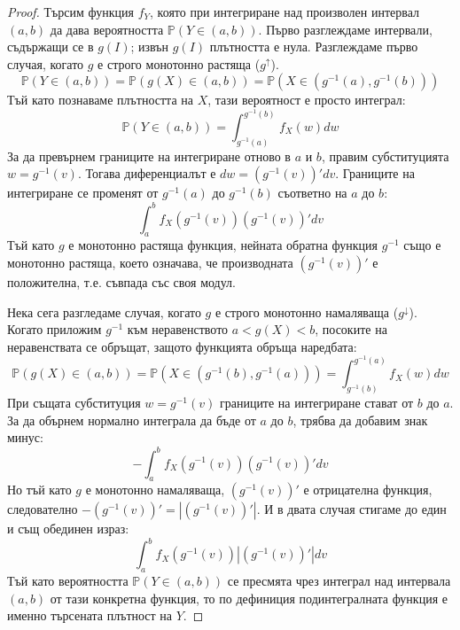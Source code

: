 \begin{proof}
Търсим функция $f_Y$, която при интегриране над произволен интервал $(a, b)$ да дава вероятността $\mathbb{P}(Y \in (a, b))$. Първо разглеждаме интервали, съдържащи се в $g(I)$; извън $g(I)$ плътността е нула.
Разглеждаме първо случая, когато $g$ е строго монотонно растяща ($g^{\uparrow}$).
\[
\mathbb{P}(Y \in (a, b)) = \mathbb{P}(g(X) \in (a, b)) = \mathbb{P}(X \in (g^{-1}(a), g^{-1}(b)))
\]
Тъй като познаваме плътността на $X$, тази вероятност е просто интеграл:
\[
\mathbb{P}(Y \in (a, b)) = \int_{g^{-1}(a)}^{g^{-1}(b)} f_X(w) dw
\]
За да превърнем границите на интегриране отново в $a$ и $b$, правим субституцията $w = g^{-1}(v)$. Тогава диференциалът е $dw = (g^{-1}(v))' dv$. Границите на интегриране се променят от $g^{-1}(a)$ до $g^{-1}(b)$ съответно на $a$ до $b$:
\[
\int_{a}^{b} f_X(g^{-1}(v)) (g^{-1}(v))' dv
\]
Тъй като $g$ е монотонно растяща функция, нейната обратна функция $g^{-1}$ също е монотонно растяща, което означава, че производната $(g^{-1}(v))'$ е положителна, т.е. съвпада със своя модул.

Нека сега разгледаме случая, когато $g$ е строго монотонно намаляваща ($g^{\downarrow}$). Когато приложим $g^{-1}$ към неравенството $a < g(X) < b$, посоките на неравенствата се обръщат, защото функцията обръща наредбата:
\[
\mathbb{P}(g(X) \in (a, b)) = \mathbb{P}(X \in (g^{-1}(b), g^{-1}(a))) = \int_{g^{-1}(b)}^{g^{-1}(a)} f_X(w) dw
\]
При същата субституция $w = g^{-1}(v)$ границите на интегриране стават от $b$ до $a$. За да обърнем нормално интеграла да бъде от $a$ до $b$, трябва да добавим знак минус:
\[
-\int_{a}^{b} f_X(g^{-1}(v)) (g^{-1}(v))' dv
\]
Но тъй като $g$ е монотонно намаляваща, $(g^{-1}(v))'$ е отрицателна функция, следователно $-(g^{-1}(v))' = \left| (g^{-1}(v))' \right|$. И в двата случая стигаме до един и същ обединен израз:
\[
\int_{a}^{b} f_X(g^{-1}(v)) \left| (g^{-1}(v))' \right| dv
\]
Тъй като вероятността $\mathbb{P}(Y \in (a, b))$ се пресмята чрез интеграл над интервала $(a,b)$ от тази конкретна функция, то по дефиниция подинтегралната функция е именно търсената плътност на $Y$.
\end{proof}

